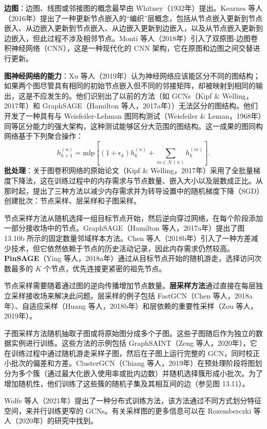 \documentclass[lang=cn,newtx,10pt,scheme=chinese]{elegantbook}
\begin{document}
\textbf{边图}：边图、线图或邻接图的概念最早由 Whitney（1932年）提出。Kearnes 等人（2016年）提出了一种更新节点嵌入的“编织”层概念，包括从节点嵌入更新到节点嵌入、从边嵌入更新到节点嵌入、从边嵌入更新到边嵌入，以及从节点嵌入更新到边嵌入，但此过程不涉及相邻节点。Monti 等人（2018年）引入了双原图-边图卷积神经网络（CNN），这是一种现代化的 CNN 架构，它在原图和边图之间交替进行更新。

\textbf{图神经网络的能力}：Xu 等人（2019年）认为神经网络应该能区分不同的图结构；如果两个图尽管具有相同的初始节点嵌入但不同的邻接矩阵，却被映射到相同的输出，这是不应发生的。他们识别出了以前的方法（如 GCNs（Kipf \& Welling，2017年）和 GraphSAGE（Hamilton 等人，2017a年））无法区分的图结构。他们开发了一种具有与 Weisfeiler-Lehman 图同构测试（Weisfeiler \& Leman，1968年）同等区分能力的强大架构，这种测试能够区分大范围的图结构。这一成果的图同构网络基于下列聚合操作：
\begin{equation}
h^{(n)}_{k+1} = \text{mlp} \left[ \left(1 + \epsilon_k\right) h^{(n)}_k + \sum_{m\in\mathcal{N}(n)} h^{(m)}_k \right]. 
\end{equation}
\textbf{批处理}：关于图卷积网络的原始论文（Kipf \& Welling，2017年）采用了全批量梯度下降法，这在训练过程中的内存需求与节点数量、嵌入大小以及层数成正比。从那时起，提出了三种方法以减少内存需求并为转导设置中的随机梯度下降（SGD）创建批次：节点采样、层采样和子图采样。

节点采样方法从随机选择一组目标节点开始，然后逆向穿过网络，在每个阶段添加一部分接收场中的节点。GraphSAGE（Hamilton 等人，2017a年）提出了图 13.10b 所示的固定数量邻域样本方法。Chen 等人（2018b年）引入了一种方差减少技术，但它依然依赖于节点的历史活动记录，因此内存需求仍然较高。\textbf{PinSAGE}（Ying 等人，2018a年）通过从目标节点开始的随机游走，选择访问次数最多的 \(K\) 个节点，优先连接更紧密的祖先节点。

节点采样需要随着通过图的逆向传播增加节点数量。\textbf{层采样方法}通过直接在每层独立采样接收场来解决此问题。层采样的例子包括 FastGCN（Chen 等人，2018a年）、自适应采样（Huang 等人，2018b年）和层依赖的重要性采样（Zou 等人，2019年）。

子图采样方法随机抽取子图或将原始图分成多个子图。这些子图随后作为独立的数据实例进行训练。这些方法的示例包括 GraphSAINT（Zeng 等人，2020年），它在训练过程中通过随机游走采样子图，然后在子图上运行完整的 GCN，同时校正小批次的偏差和方差。ClusterGCN（Chiang 等人，2019年）在预处理阶段将图划分为多个簇（通过最大化嵌入使用率或批内边数）并随机选择簇形成小批次。为了增加随机性，他们训练了这些簇的随机子集及其相互间的边（参见图 13.11）。

Wolfe 等人（2021年）提出了一种分布式训练方法，该方法通过不同方式划分特征空间，来并行训练更窄的 GCNs。有关采样图的更多信息可以在 Rozemberczki 等人（2020年）的研究中找到。
\end{document}
